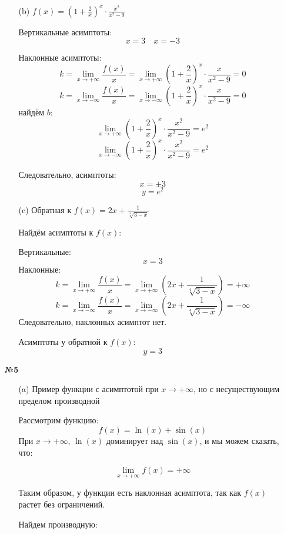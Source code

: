 \documentclass[a4paper]{article}
\renewcommand{\f}[2]{\frac{#1}{#2}}
\begin{document}
\begin{enumerate}
\begin{enumerate}
        \item[(b)]$ f(x) = \left(1 + \frac{2}{x}\right)^{x} \cdot \frac{x^{2}}{x^{2} - 9} $
        
        Вертикальные асимптоты:
        $$x = 3 \quad x=-3$$

        Наклонные асимптоты:
        $$k = \lim_{x \to +\infty}{\f{f(x)}{x}} = \lim_{x \to + \infty}\left(1 + \frac{2}{x}\right)^{x} \cdot \frac{x}{x^{2} - 9} = 0$$
        $$k = \lim_{x \to -\infty}{\f{f(x)}{x}} = \lim_{x \to - \infty}\left(1 + \frac{2}{x}\right)^{x} \cdot \frac{x}{x^{2} - 9} = 0$$
        найдём $b$:
        $$\lim_{x \to +\infty}\left(1 + \frac{2}{x}\right)^{x} \cdot \frac{x^{2}}{x^{2} - 9} = e^2$$
        $$\lim_{x \to -\infty}\left(1 + \frac{2}{x}\right)^{x} \cdot \frac{x^{2}}{x^{2} - 9} = e^2$$

        Следовательно, асимптоты:
        $$x = \pm 3$$
        $$y = e^2$$

        \item[(c)]Обратная к $f(x) = 2x+\frac{1}{\sqrt[4]{3-x}}$
        
        Найдём асимптоты к $f(x)$:

        Вертикальные:
        $$x = 3$$
        Наклонные:
        $$k = \lim_{x \to +\infty}{\f{f(x)}{x}} = \lim_{x \to +\infty}\left(2x+\frac{1}{\sqrt[4]{3-x}}\right) = +\infty$$
        $$k = \lim_{x \to -\infty}{\f{f(x)}{x}} = \lim_{x \to -\infty}\left(2x+\frac{1}{\sqrt[4]{3-x}}\right) = -\infty$$
        Следовательно, наклонных асимптот нет.

        Асимптоты у обратной к $f(x)$:
        $$y = 3$$
        
    \end{enumerate}

    \item[\textbf{№5}]\begin{enumerate}
        \item[(a)]Пример функции с асимптотой при $ x \rightarrow +\infty $, но с несуществующим пределом производной

        Рассмотрим функцию:
        $$
        f(x) = \ln(x) + \sin(x)
        $$
        При $ x \rightarrow +\infty $, $ \ln(x) $ доминирует над $ \sin(x) $, и мы можем сказать, что:

        $$
        \lim_{x \rightarrow +\infty} f(x) = +\infty
        $$

        Таким образом, у функции есть наклонная асимптота, так как $ f(x) $ растет без ограничений.

        Найдем производную:


\end{enumerate}
\end{enumerate}
\end{document}
